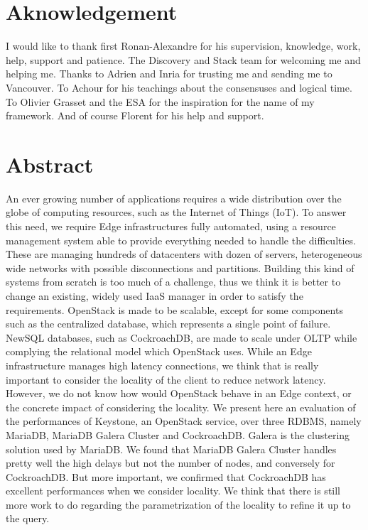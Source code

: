 \documentclass[a4paper, 10pt, titlepage]{report}
\begin{document}
\clearpage
\tableofcontents
\newpage

\section*{Aknowledgement}

I would like to thank first Ronan-Alexandre for his supervision, knowledge, work, help, support and patience. The Discovery and Stack team for welcoming me and helping me. Thanks to Adrien and Inria for trusting me and sending me to Vancouver. To Achour for his teachings about the consensuses and logical time. To Olivier Grasset and the ESA for the inspiration for the name of my framework. And of course Florent for his help and support.

\newpage

\section*{Abstract}

An ever growing number of applications requires a wide distribution over the globe of computing resources, such as the Internet of Things (IoT). To answer this need, we require Edge infrastructures fully automated, using a resource management system able to provide everything needed to handle the difficulties. These are managing hundreds of datacenters with dozen of servers, heterogeneous wide networks with possible disconnections and partitions. Building this kind of systems from scratch is too much of a challenge, thus we think it is better to change an existing, widely used IaaS manager in order to satisfy the requirements.
OpenStack is made to be scalable, except for some components such as the centralized database, which represents a single point of failure. NewSQL databases, such as CockroachDB, are made to scale under OLTP while complying the relational model which OpenStack uses. While an Edge infrastructure manages high latency connections, we think that is really important to consider the locality of the client to reduce network latency.
However, we do not know how would OpenStack behave in an Edge context, or the concrete impact of considering the locality.
We present here an evaluation of the performances of Keystone, an OpenStack service, over three RDBMS, namely MariaDB, MariaDB Galera Cluster and CockroachDB. Galera is the clustering solution used by MariaDB.
We found that MariaDB Galera Cluster handles pretty well the high delays but not the number of nodes, and conversely for CockroachDB. But more important, we confirmed that CockroachDB has excellent performances when we consider locality.
We think that there is still more work to do regarding the parametrization of the locality to refine it up to the query.
\end{document}
